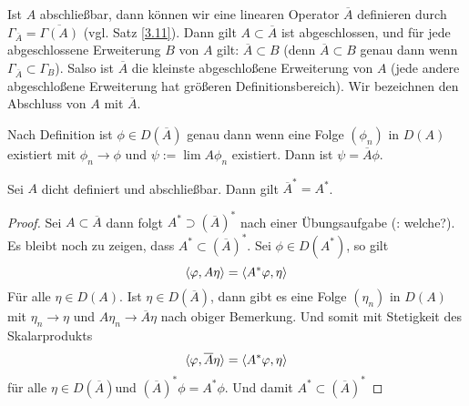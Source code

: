 \documentclass{mycourse}
\begin{document}
Ist $A$ abschließbar, dann können wir eine linearen Operator $\overline{A}$ definieren durch $\Gamma_{\overline{A}} = \overline{\Gamma(A)}$ (vgl. Satz \ref{3.11}). Dann gilt $A\subset \overline{A}$ ist abgeschlossen, und für jede abgeschlossene Erweiterung $B$ von $A$ gilt: $\overline{A} \subset B$ (denn $\overline{A}\subset B$ genau dann wenn $\Gamma_{\overline{A}} \subset \Gamma_B$). Salso ist $\overline{A}$ die kleinste abgeschloßene Erweiterung  von $A$ (jede andere abgeschloßene Erweiterung hat größeren Definitionsbereich). Wir bezeichnen den Abschluss von $A$ mit $\overline{A}$. 

Nach Definition ist $\phi \in D(\overline{A})$ genau dann wenn eine Folge $(\phi_n)$ in $D(A)$ existiert mit $\phi_n \to \phi$ und $\psi:= \lim A\phi_n$ existiert. Dann ist $\psi= \overline A\phi$.

\begin{lem}\label{3.12}
Sei $A$ dicht definiert und abschließbar. Dann gilt $\overline{A}^*=A^*$.
\end{lem}
\begin{proof}
Sei $A\subset \overline{A}$ dann folgt $A^* \supset (\overline{A})^*$ nach einer Übungsaufgabe (\fixme: welche?). Es bleibt noch zu zeigen, dass $A^*\subset(\overline{A})^*$. Sei $\phi \in D(A^*)$, so gilt
\[
\langle \varphi, A \eta\rangle =\langle A^* \varphi, \eta\rangle
\]
Für alle $\eta \in D(A)$. Ist $\eta \in D(\overline A)$, dann gibt es eine Folge $(\eta_n)$ in $D(A)$ mit $\eta_n \to \eta$ und $A\eta_n \to \overline{A}\eta$ nach obiger Bemerkung. Und somit mit Stetigkeit des Skalarprodukts
\[
\langle \varphi, \overline{A}\eta\rangle = \langle A^* \varphi, \eta\rangle
\]
für alle $\eta \in D(\overline{A})$und $(\overline{A})^*\phi = A^*\phi$. Und damit $A^*\subset (\overline{A})^*$
\end{proof}
\end{document}
